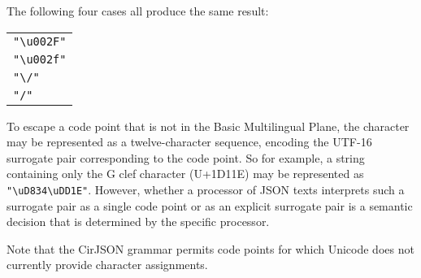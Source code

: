 The following four cases all produce the same result:

\FloatBarrier

\begin{table*}[!htbp]
	\begin{tabular}{l}
		\texttt{"{\textbackslash}u002F"} \\
		\texttt{"{\textbackslash}u002f"} \\
		\texttt{"{\textbackslash}/"} \\
		\texttt{"/"} \\
	\end{tabular}
\end{table*}

\FloatBarrier

To escape a code point that is not in the Basic Multilingual Plane, the character may be represented as a twelve-character sequence, encoding the UTF-16 surrogate pair corresponding to the code point.
So for example, a string containing only the G clef character (U+1D11E) may be represented as \texttt{"{\textbackslash}uD834{\textbackslash}uDD1E"}.
However, whether a processor of JSON texts interprets such a surrogate pair as a single code point or as an explicit surrogate pair is a semantic decision that is determined by the specific processor.

Note that the CirJSON grammar permits code points for which Unicode does not currently provide character assignments.

\FloatBarrier

